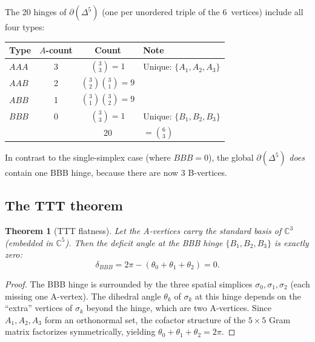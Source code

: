 \documentclass[12pt]{article}
\newtheorem{theorem}{Theorem}[section]
\theoremstyle{remark}
\theoremstyle{definition}
\newcommand{\CC}{\mathbb{C}}
\begin{document}
The 20 hinges of $\partial(\Delta^5)$ (one per unordered triple of the 6~vertices) include all four types:

\begin{center}
\begin{tabular}{lccl}
\toprule
Type & $A$-count & Count & Note \\
\midrule
$AAA$ & 3 & $\binom{3}{3} = 1$ & Unique: $\{A_1, A_2, A_3\}$ \\
$AAB$ & 2 & $\binom{3}{2}\binom{3}{1} = 9$ & \\
$ABB$ & 1 & $\binom{3}{1}\binom{3}{2} = 9$ & \\
$BBB$ & 0 & $\binom{3}{3} = 1$ & Unique: $\{B_1, B_2, B_3\}$ \\
\midrule
& & 20 & $= \binom{6}{3}$ \\
\bottomrule
\end{tabular}
\end{center}

\noindent
In contrast to the single-simplex case (where $BBB = 0$), the global $\partial(\Delta^5)$ \emph{does} contain one BBB hinge, because there are now 3 B-vertices.

\subsection{The TTT theorem}
\label{sec:ttt}

\begin{theorem}[TTT flatness]
\label{thm:ttt}
Let the A-vertices carry the standard basis of $\CC^3$ (embedded in $\CC^5$).  Then the deficit angle at the BBB hinge $\{B_1, B_2, B_3\}$ is exactly zero:
\begin{equation}
\delta_{BBB} = 2\pi - (\theta_0 + \theta_1 + \theta_2) = 0.
\end{equation}
\end{theorem}

\begin{proof}
The BBB hinge is surrounded by the three spatial simplices $\sigma_0, \sigma_1, \sigma_2$ (each missing one A-vertex).  The dihedral angle $\theta_k$ of $\sigma_k$ at this hinge depends on the ``extra'' vertices of $\sigma_k$ beyond the hinge, which are two A-vertices.  Since $A_1, A_2, A_3$ form an orthonormal set, the cofactor structure of the $5 \times 5$ Gram matrix factorizes symmetrically, yielding $\theta_0 + \theta_1 + \theta_2 = 2\pi$.
\end{proof}
\end{document}
